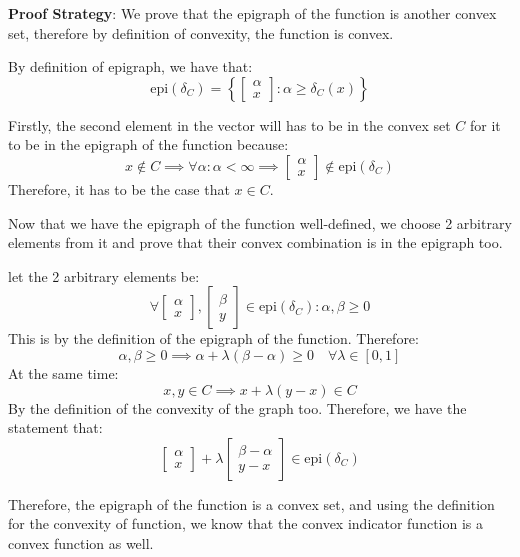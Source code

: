 \documentclass[]{article}
\begin{document}
    \par
    \textbf{Proof Strategy}: We prove that the epigraph of the function is another convex set, therefore by definition of convexity, the function is convex.
    
    \par
    By definition of epigraph, we have that:
        \begin{equation*}\tag{2.a.2}\label{eqn:2.a.2}
            \text{epi}(\delta_C) = \left\lbrace
            \begin{bmatrix}
                \alpha \\ x
            \end{bmatrix} :
            \alpha \ge \delta_C(x)
        \right\rbrace
        \end{equation*}
    
    \par
    Firstly, the second element in the vector will has to be in the convex set $C$ for it to be in the epigraph of the function because:
        $$
        x\not\in C \implies \forall \alpha: \alpha < \infty \implies
        \begin{bmatrix}
        \alpha \\ x
        \end{bmatrix}
        \not\in \text{epi}(\delta_C)
        $$
    Therefore, it has to be the case that $x \in C$.
    
    \vspace{1em}\par
    Now that we have the epigraph of the function well-defined, we choose 2 arbitrary elements from it and prove that their convex combination is in the epigraph too.
    \par
    let the 2 arbitrary elements be:
        $$
        \forall \begin{bmatrix}
        \alpha \\ x
        \end{bmatrix}, \begin{bmatrix}
        \beta \\ y
        \end{bmatrix}
        \in \text{epi}(\delta_C): \alpha, \beta \ge 0
        $$
    This is by the definition of the epigraph of the function.
    Therefore:
        $$
        \alpha, \beta \ge 0 \implies \alpha + \lambda(\beta - \alpha) \ge 0 \quad \forall
        \lambda \in [0, 1]
        $$
    At the same time:
        $$
        x, y \in C \implies x + \lambda (y - x) \in C
        $$
    By the definition of the convexity of the graph too.
    Therefore, we have the statement that:
        $$
        \begin{bmatrix}
        \alpha \\ x
        \end{bmatrix} + \lambda \begin{bmatrix}
        \beta - \alpha \\ y - x
        \end{bmatrix}\in \text{epi}(\delta_C)
        $$
    \par
    Therefore, the epigraph of the function is a convex set, and using the definition for the convexity of function, we know that the convex indicator function is a convex function as well.
\end{document}
